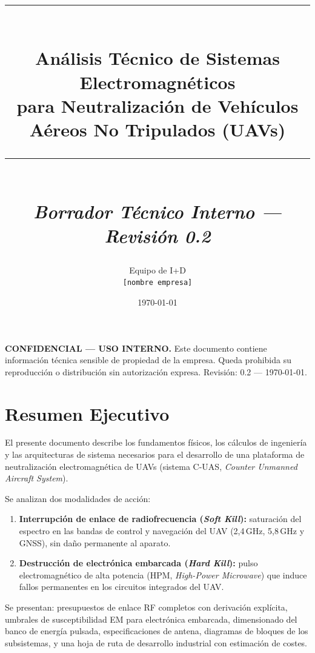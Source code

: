 \documentclass[12pt,a4paper]{article}
\title{
  \vspace{1cm}
  {\color{azultec}\rule{\textwidth}{2pt}}\\[0.8em]
  {\LARGE\bfseries Análisis Técnico de Sistemas Electromagnéticos}\\[0.4em]
  {\large para Neutralización de Vehículos Aéreos No Tripulados (UAVs)}\\[0.3em]
  {\color{azultec}\rule{\textwidth}{0.8pt}}\\[0.5em]
  {\normalsize\itshape Borrador Técnico Interno — Revisión 0.2}
}
\author{
  Equipo de I+D\\
  \small\texttt{[nombre empresa]}
}
\date{\today}
\begin{document}

\maketitle
\thispagestyle{empty}

\vspace{1cm}
\begin{tcolorbox}[colback=rojoalerta!8, colframe=rojoalerta, title=Clasificación del Documento, fonttitle=\bfseries]
  \textbf{CONFIDENCIAL — USO INTERNO.}
  Este documento contiene información técnica sensible de propiedad de la empresa.
  Queda prohibida su reproducción o distribución sin autorización expresa.
  Revisión: 0.2 — \today.
\end{tcolorbox}

\newpage
\tableofcontents
\newpage

\section*{Resumen Ejecutivo}

El presente documento describe los fundamentos físicos, los cálculos de ingeniería
y las arquitecturas de sistema necesarios para el desarrollo de una plataforma de
neutralización electromagnética de UAVs (sistema C-UAS,
\textit{Counter Unmanned Aircraft System}).

Se analizan dos modalidades de acción:

\begin{enumerate}
  \item \textbf{Interrupción de enlace de radiofrecuencia (\textit{Soft Kill}):}
        saturación del espectro en las bandas de control y navegación del UAV
        (2,4\,GHz, 5,8\,GHz y GNSS), sin daño permanente al aparato.
  \item \textbf{Destrucción de electrónica embarcada (\textit{Hard Kill}):}
        pulso electromagnético de alta potencia (HPM,
        \textit{High-Power Microwave}) que induce fallos permanentes en los
        circuitos integrados del UAV.
\end{enumerate}

Se presentan: presupuestos de enlace RF completos con derivación explícita,
umbrales de susceptibilidad EM para electrónica embarcada, dimensionado del
banco de energía pulsada, especificaciones de antena, diagramas de bloques
de los subsistemas, y una hoja de ruta de desarrollo industrial con estimación
de costes.
\end{document}
